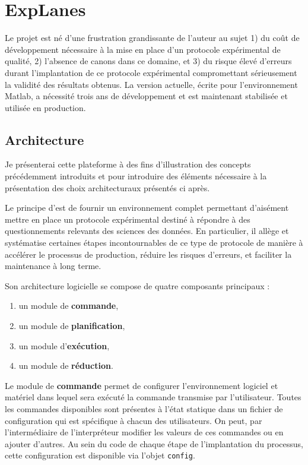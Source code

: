 \section{\nmu ExpLanes} \label{sec:explanes}

Le projet \explanes {} est né d'une frustration grandissante de l'auteur au sujet 1) du coût de développement nécessaire à la mise en place d'un protocole expérimental de qualité, 2) l'absence de canons dans ce domaine, et 3) du risque élevé d'erreurs durant l'implantation de ce protocole expérimental compromettant sérieusement la validité des résultats obtenus. La version actuelle, écrite pour l'environnement \textsf{Matlab}\textsuperscript{\tiny\textregistered}, a nécessité trois ans de développement et est maintenant stabilisée et utilisée en production.

\subsection{Architecture}

Je présenterai cette plateforme à des fins d'illustration des concepts précédemment introduits et pour introduire des éléments nécessaire à la présentation des choix architecturaux présentés ci après.

Le principe d'\explanes est de fournir un environnement complet permettant d'aisément mettre en place un protocole expérimental destiné à répondre à des questionnements relevants des sciences des données. En particulier, il allège et systématise certaines étapes incontournables de ce type de protocole de manière à accélérer le processus de production, réduire les risques d'erreurs, et faciliter la maintenance à long terme.

Son architecture logicielle se compose de quatre composants principaux :
\begin{enumerate}
  \item un module de \textbf{commande},
  \item un module de \textbf{planification},
  \item un module d'\textbf{exécution},
  \item un module de \textbf{réduction}.
\end{enumerate}

Le module de \textbf{commande} permet de configurer l'environnement logiciel et matériel dans lequel sera exécuté la commande transmise par l'utilisateur. Toutes les commandes disponibles sont présentes à l'état statique dans un fichier de configuration qui est spécifique à chacun des utilisateurs. On peut, par l'intermédiaire de l'interpréteur modifier les valeurs de ces commandes ou en ajouter d'autres. Au sein du code de chaque étape de l'implantation du processus, cette configuration est disponible via l'objet \texttt{config}.

